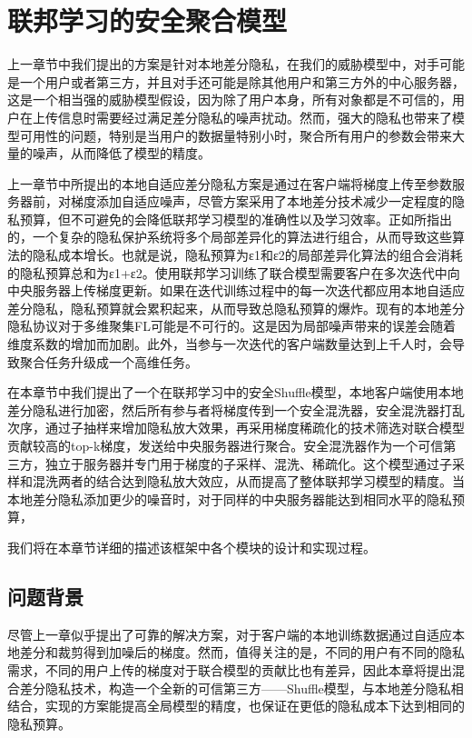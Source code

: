 \chapter{联邦学习的安全聚合模型}
\label{ch4}

上一章节中我们提出的方案是针对本地差分隐私，在我们的威胁模型中，对手可能是一个用户或者第三方，并且对手还可能是除其他用户和第三方外的中心服务器，这是一个相当强的威胁模型假设，因为除了用户本身，所有对象都是不可信的，用户在上传信息时需要经过满足差分隐私的噪声扰动。然而，强大的隐私也带来了模型可用性的问题，特别是当用户的数据量特别小时，聚合所有用户的参数会带来大量的噪声，从而降低了模型的精度。

上一章节中所提出的本地自适应差分隐私方案是通过在客户端将梯度上传至参数服务器前，对梯度添加自适应噪声，尽管方案采用了本地差分技术减少一定程度的隐私预算，但不可避免的会降低联邦学习模型的准确性以及学习效率。正如所指出的，一个复杂的隐私保护系统将多个局部差异化的算法进行组合，从而导致这些算法的隐私成本增长。也就是说，隐私预算为ε1和ε2的局部差异化算法的组合会消耗的隐私预算总和为ε1+ε2。使用联邦学习训练了联合模型需要客户在多次迭代中向中央服务器上传梯度更新。如果在迭代训练过程中的每一次迭代都应用本地自适应差分隐私，隐私预算就会累积起来，从而导致总隐私预算的爆炸。现有的本地差分隐私协议对于多维聚集FL可能是不可行的。这是因为局部噪声带来的误差会随着维度系数的增加而加剧。此外，当参与一次迭代的客户端数量达到上千人时，会导致聚合任务升级成一个高维任务。

在本章节中我们提出了一个在联邦学习中的安全Shuffle模型，本地客户端使用本地差分隐私进行加密，然后所有参与者将梯度传到一个安全混洗器，安全混洗器打乱次序，通过子抽样来增加隐私放大效果，再采用梯度稀疏化的技术筛选对联合模型贡献较高的top-k梯度，发送给中央服务器进行聚合。安全混洗器作为一个可信第三方，独立于服务器并专门用于梯度的子采样、混洗、稀疏化。这个模型通过子采样和混洗两者的结合达到隐私放大效应，从而提高了整体联邦学习模型的精度。当本地差分隐私添加更少的噪音时，对于同样的中央服务器能达到相同水平的隐私预算，

我们将在本章节详细的描述该框架中各个模块的设计和实现过程。

\section{问题背景}
尽管上一章似乎提出了可靠的解决方案，对于客户端的本地训练数据通过自适应本地差分和裁剪得到加噪后的梯度。然而，值得关注的是，不同的用户有不同的隐私需求，不同的用户上传的梯度对于联合模型的贡献比也有差异，因此本章将提出混合差分隐私技术，构造一个全新的可信第三方——Shuffle模型，与本地差分隐私相结合，实现的方案能提高全局模型的精度，也保证在更低的隐私成本下达到相同的隐私预算。

